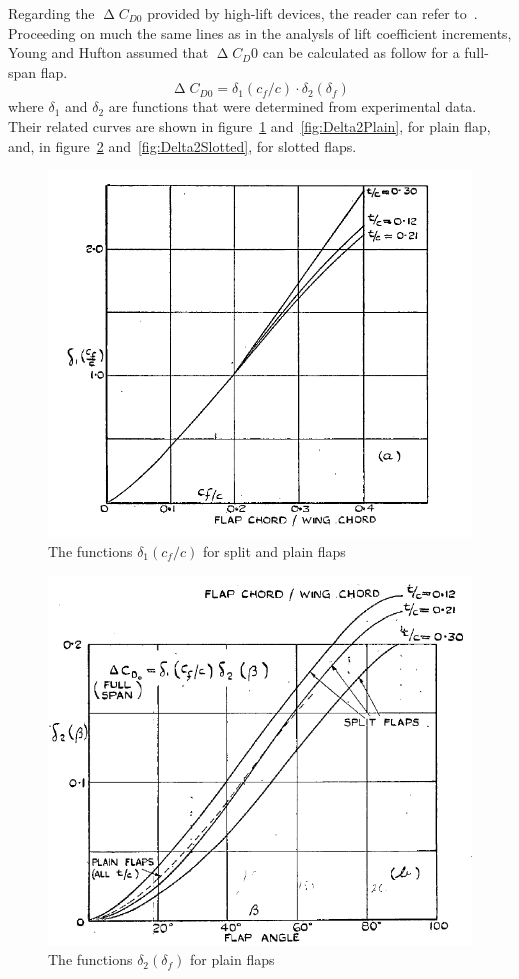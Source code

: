\bigskip
\noindent
Regarding the $\upDelta C_{D0}$ provided by high-lift devices, the reader can refer to~\cite{Young:Flaps}. Proceeding on much the same lines as in the analysls of lift coefficient increments, Young and Hufton assumed that  $\upDelta C_D0$ can be calculated as follow for a full-span flap.
%
\begin{equation}
\upDelta C_{D0}=\delta_1\left(c_f/c\right)\cdot\delta_2\left(\delta_f\right)
\label{eqn:DeltaCD0FullSpan}
\end{equation}
%
where $\delta_1$ and $\delta_2$ are functions that were determined from experimental data. Their related curves are shown in figure~\ref{fig:Delta1Plain} and~\ref{fig:Delta2Plain}, for plain flap, and, in figure~\ref{fig:Delta1Slotted} and~\ref{fig:Delta2Slotted}, for slotted flaps.
%
\begin{figure}[!b]
\centering
\includegraphics[width=0.9\linewidth]{Delta1_Plain}
\caption{The functions $\delta_1\left(c_f/c\right)$ for split and plain flaps}
\label{fig:Delta1Plain}
\end{figure}
%
\begin{figure}[H]
\centering
\includegraphics[width=0.7\linewidth]{Delta2_Plain}
\caption{The functions $\delta_2\left(\delta_f\right)$ for plain flaps}
\label{fig:Delta1Slotted}
\end{figure}
